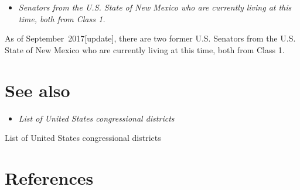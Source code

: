 \begin{itemize}
\item
  \emph{Senators from the U.S. State of New Mexico who are currently
  living at this time, both from Class 1.}
\end{itemize}

As of September~2017{[}update{]}, there are two former U.S. Senators
from the U.S. State of New Mexico who are currently living at this time,
both from Class 1.

\section{See also}\label{see-also}

\begin{itemize}
\item
  \emph{List of United States congressional districts}
\end{itemize}

List of United States congressional districts

\section{References}\label{references}

